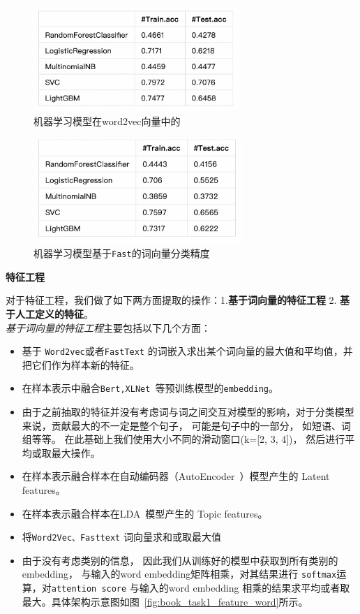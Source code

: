 \begin{figure}[ht]
 \centering
 \includegraphics[height=4cm]{images/book_task1_table1.jpg}
 \caption{机器学习模型在word2vec向量中的\\}
 \label{fig:book_task1_table1}
\end{figure}

\begin{figure}[ht]
 \centering
 \includegraphics[height=4cm]{images/book_task1_table2.jpg}
 \caption{机器学习模型基于\texttt{Fast}的词向量分类精度\\}
 \label{fig:book_task1_table2}
\end{figure}


\noindent \textbf{特征工程}

\noindent 对于特征工程，我们做了如下两方面提取的操作：1.\textbf{基于词向量的特征工程} 2. \textbf{基于人工定义的特征}。\\

\noindent \textit{基于词向量的特征工程}主要包括以下几个方面：

\begin{itemize}
    \item 基于 \texttt{Word2vec}或者\texttt{FastText} 的词嵌入求出某个词向量的最大值和平均值，并把它们作为样本新的特征。
    \item 在样本表示中融合\texttt{Bert,XLNet~\cite{yang2019xlnet}}等预训练模型的\texttt{embedding}。
    \item 由于之前抽取的特征并没有考虑词与词之间交互对模型的影响，对于分类模型来说，贡献最大的不一定是整个句子， 可能是句子中的一部分， 如短语、词组等等。 在此基础上我们使用大小不同的滑动窗口(k=[2, 3, 4])， 然后进行平均或取最大操作。
    \item 在样本表示融合样本在自动编码器（AutoEncoder~\cite{bourlard1988auto}）模型产生的 Latent features。
    \item 在样本表示融合样本在LDA~\cite{blei2003latent}模型产生的 Topic features。
    \item 将\texttt{Word2Vec、Fasttext} 词向量求和或取最大值
    \item 由于没有考虑类别的信息， 因此我们从训练好的模型中获取到所有类别的embedding， 与输入的word embedding矩阵相乘，对其结果进行 \texttt{softmax}运算，对\texttt{attention score} 与输入的word embedding 相乘的结果求平均或者取最大。具体架构示意图如图~\ref{fig:book_task1_feature_word}所示。 
\end{itemize}


